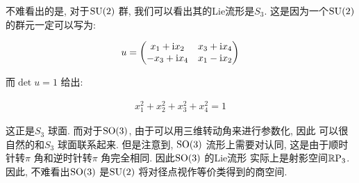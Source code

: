 \begin{remark}
  不难看出的是, 对于${\rm SU}(2)$ 群, 我们可以看出其的Lie流形是$S_3$.
  这是因为一个${\rm SU}(2)$ 的群元一定可以写为:

  \begin{equation}
    \begin{aligned}
      u =
      \begin{pmatrix}
        x_1 + {\rm i} x_2 & x_3 + {\rm i} x_4 \\
        -x_3 + {\rm i} x_4 & x_1 - {\rm i} x_2
      \end{pmatrix}
    \end{aligned}
  \end{equation}

  而$\det u=1$ 给出:
  
  \begin{equation}
    \begin{aligned}
      x_1^{2} + x_2^{2} + x_3^{2} + x_4^{2} = 1
    \end{aligned}
  \end{equation}

  这正是$S_3$ 球面. 而对于${\rm SO}(3)$, 由于可以用三维转动角来进行参数化, 因此
  可以很自然的和$S_3$ 球面联系起来. 但是注意到, ${\rm SO}(3)$ 流形上需要对认同,
  这是由于顺时针转$\pi$ 角和逆时针转$\pi$ 角完全相同. 因此${\rm SO}(3)$ 的Lie流形
  实际上是射影空间${\rm \mathbb{R}P}_3$. 因此, 不难看出${\rm SO}(3)$ 是${\rm SU}(2)$ 
  将对径点视作等价类得到的商空间.

\end{remark}


